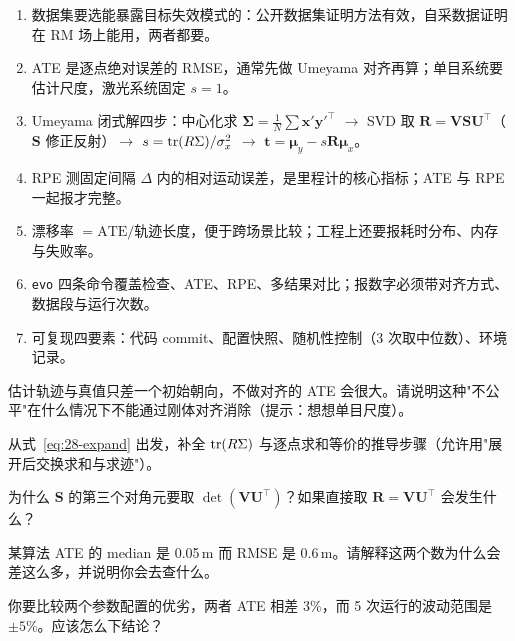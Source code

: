 \begin{summary}

\begin{enumerate}
  \item 数据集要选能暴露目标失效模式的：公开数据集证明方法有效，自采数据证明在 RM 场上能用，两者都要。
  \item ATE 是逐点绝对误差的 RMSE，通常先做 Umeyama 对齐再算；单目系统要估计尺度，激光系统固定 $s=1$。
  \item Umeyama 闭式解四步：中心化求 $\bm{\Sigma}=\frac1N\sum\bm{x}'{\bm{y}'}^{\top}$ $\to$ SVD 取 $\bm{R}=\bm{V}\bm{S}\bm{U}^{\top}$（$\bm{S}$ 修正反射）$\to$ $s=\operatorname{tr}(R\Sigma)/\sigma_x^{2}$ $\to$ $\bm{t}=\bm{\mu}_y-s\bm{R}\bm{\mu}_x$。
  \item RPE 测固定间隔 $\Delta$ 内的相对运动误差，是里程计的核心指标；ATE 与 RPE 一起报才完整。
  \item 漂移率 $=\mathrm{ATE}/\text{轨迹长度}$，便于跨场景比较；工程上还要报耗时分布、内存与失败率。
  \item \lstinline{evo} 四条命令覆盖检查、ATE、RPE、多结果对比；报数字必须带对齐方式、数据段与运行次数。
  \item 可复现四要素：代码 commit、配置快照、随机性控制（3 次取中位数）、环境记录。
\end{enumerate}


\end{summary}

\begin{problemset}

  \item 估计轨迹与真值只差一个初始朝向，不做对齐的 ATE 会很大。请说明这种"不公平"在什么情况下不能通过刚体对齐消除（提示：想想单目尺度）。
  \item 从式~\eqref{eq:28-expand} 出发，补全 $\operatorname{tr}(R\Sigma)$ 与逐点求和等价的推导步骤（允许用"展开后交换求和与求迹"）。
  \item 为什么 $\bm{S}$ 的第三个对角元要取 $\det(\bm{V}\bm{U}^{\top})$？如果直接取 $\bm{R}=\bm{V}\bm{U}^{\top}$ 会发生什么？
  \item 某算法 ATE 的 median 是 0.05\,m 而 RMSE 是 0.6\,m。请解释这两个数为什么会差这么多，并说明你会去查什么。
  \item 你要比较两个参数配置的优劣，两者 ATE 相差 3\%，而 5 次运行的波动范围是 $\pm5\%$。应该怎么下结论？
\end{problemset}

